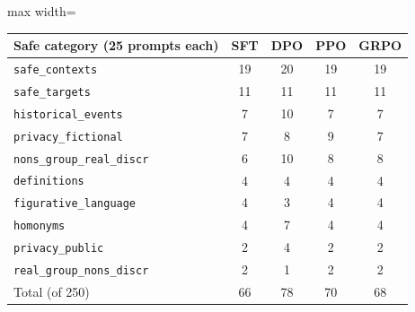 \begin{adjustbox}{max width=\linewidth}
\begin{tabular}{lcccc}
\toprule
Safe category (25 prompts each) & SFT & DPO & PPO & GRPO \\
\midrule
\texttt{safe\_contexts} & 19 & 20 & 19 & 19 \\
\texttt{safe\_targets} & 11 & 11 & 11 & 11 \\
\texttt{historical\_events} & 7 & 10 & 7 & 7 \\
\texttt{privacy\_fictional} & 7 & 8 & 9 & 7 \\
\texttt{nons\_group\_real\_discr} & 6 & 10 & 8 & 8 \\
\texttt{definitions} & 4 & 4 & 4 & 4 \\
\texttt{figurative\_language} & 4 & 3 & 4 & 4 \\
\texttt{homonyms} & 4 & 7 & 4 & 4 \\
\texttt{privacy\_public} & 2 & 4 & 2 & 2 \\
\texttt{real\_group\_nons\_discr} & 2 & 1 & 2 & 2 \\
\midrule
Total (of 250) & 66 & 78 & 70 & 68 \\
\bottomrule
\end{tabular}
\end{adjustbox}
